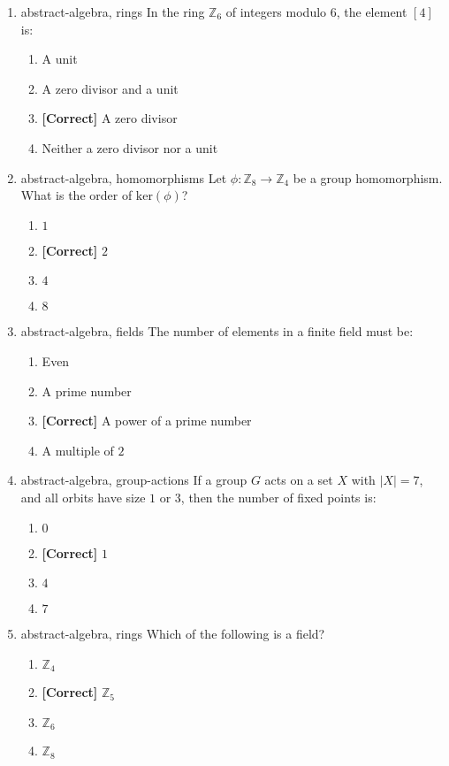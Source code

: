 \documentclass{article}
\newenvironment{problem}{\item}{}
\newcommand{\choice}{\item}
\newcommand{\correctchoice}{\item \textbf{[Correct] }}
\newcommand{\tags}[1]{#1} %
\begin{document}
\begin{enumerate}
        \begin{problem}
            \tags{abstract-algebra, rings}
            In the ring $\mathbb{Z}_6$ of integers modulo $6$, the element $[4]$ is:
            \begin{enumerate}
                \choice A unit
                \choice A zero divisor and a unit
                \correctchoice A zero divisor
                \choice Neither a zero divisor nor a unit
            \end{enumerate}
        \end{problem}
        
        \begin{problem}
            \tags{abstract-algebra, homomorphisms}
            Let $\phi: \mathbb{Z}_8 \to \mathbb{Z}_4$ be a group homomorphism. What is the order of $\text{ker}(\phi)$?
            \begin{enumerate}
                \choice $1$
                \correctchoice $2$
                \choice $4$
                \choice $8$
            \end{enumerate}
        \end{problem}
        
        \begin{problem}
            \tags{abstract-algebra, fields}
            The number of elements in a finite field must be:
            \begin{enumerate}
                \choice Even
                \choice A prime number
                \correctchoice A power of a prime number
                \choice A multiple of $2$
            \end{enumerate}
        \end{problem}
        
        \begin{problem}
            \tags{abstract-algebra, group-actions}
            If a group $G$ acts on a set $X$ with $|X| = 7$, and all orbits have size $1$ or $3$, then the number of fixed points is:
            \begin{enumerate}
                \choice $0$
                \correctchoice $1$
                \choice $4$
                \choice $7$
            \end{enumerate}
        \end{problem}
        
        \begin{problem}
            \tags{abstract-algebra, rings}
            Which of the following is a field?
            \begin{enumerate}
                \choice $\mathbb{Z}_4$
                \correctchoice $\mathbb{Z}_5$
                \choice $\mathbb{Z}_6$
                \choice $\mathbb{Z}_8$
            \end{enumerate}
        \end{problem}
        

\end{enumerate}
\end{document}
